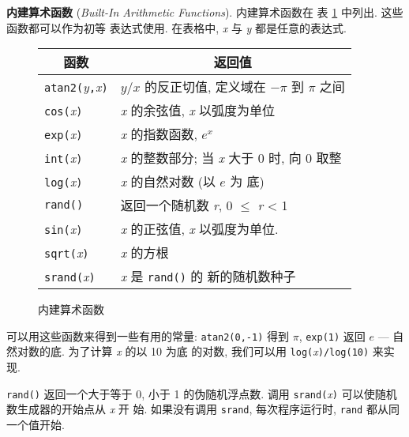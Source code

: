 \textbf{内建算术函数} (\emph{Built-In Arithmetic Functions}). 内建算术函数在
表 \ref{tbl:built_in_arithmetic_functions} 中列出. 这些函数都可以作为初等
表达式使用. 在表格中, \textit{x} 与 \textit{y} 都是任意的表达式.

\begin{figure}[ht]
\captionsetup{type=table}
\caption{内建算术函数}
\label{tbl:built_in_arithmetic_functions}
\begin{center}
    \begin{tabular}{l|l}
        \hline
        \hline
        \multicolumn{1}{c|}{函数}    & \multicolumn{1}{c}{返回值}    \\
        \hline
        \verb'atan2('\textit{y}\verb','\textit{x}\verb')'   & $y/x$ 的反正切值,
        定义域在 $-\pi$ 到 $\pi$ 之间   \\
        \verb'cos('\textit{x}\verb')'   & \textit{x} 的余弦值, \textit{x}
        以弧度为单位    \\
        \verb'exp('\textit{x}\verb')'   & \textit{x} 的指数函数, $e^x$ \\
        \verb'int('\textit{x}\verb')'   & \textit{x} 的整数部分; 当
        \textit{x} 大于 0 时, 向 0 取整 \\
        \verb'log('\textit{x}\verb')'   & \textit{x} 的自然对数 (以 $e$ 为
        底)  \\
        \verb'rand()'   & 返回一个随机数 \textit{r}, 0 $\le$ \textit{r}
        < 1 \\
        \verb'sin('\textit{x}\verb')'   & \textit{x} 的正弦值, \textit{x}
        以弧度为单位.   \\
        \verb'sqrt('\textit{x}\verb')'  & \textit{x} 的方根 \\
        \verb'srand('\textit{x}\verb')' & \textit{x} 是 \verb'rand()' 的
        新的随机数种子  \\
        \hline
    \end{tabular}
\end{center}
\end{figure}

可以用这些函数来得到一些有用的常量: \verb'atan2(0,-1)' 得到 $\pi$,
\verb'exp(1)' 返回 $e$ --- 自然对数的底. 为了计算 \textit{x} 的以 10 为底
的对数, 我们可以用 \verb'log('\textit{x}\verb')/log(10)' 来实现.

\verb'rand()' 返回一个大于等于 0, 小于 1 的伪随机浮点数. 调用
\verb'srand('\textit{x}\verb')' 可以使随机数生成器的开始点从 \textit{x} 开
始. 如果没有调用 \verb'srand', 每次程序运行时, \verb'rand'
都从同一个值开始.

